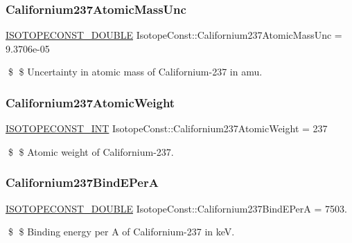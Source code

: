\subsubsection{\texorpdfstring{Californium237\+Atomic\+Mass\+Unc}{Californium237AtomicMassUnc}}
{\footnotesize\ttfamily \mbox{\hyperlink{group___isotope_const-_macros_ga8f45a7272ce02c0b4c65c44636ed719a}{I\+S\+O\+T\+O\+P\+E\+C\+O\+N\+S\+T\+\_\+\+D\+O\+U\+B\+LE}} Isotope\+Const\+::\+Californium237\+Atomic\+Mass\+Unc = 9.\+3706e-\/05}

\$ \$ Uncertainty in atomic mass of Californium-\/237 in amu. \mbox{\label{group___isotope_const-_californium-_cf237_gadfb41fc8fc7691fd99783629ab7826ae}} 
\subsubsection{\texorpdfstring{Californium237\+Atomic\+Weight}{Californium237AtomicWeight}}
{\footnotesize\ttfamily \mbox{\hyperlink{group___isotope_const-_macros_ga5f18360b3e99483a35c32d789e62621c}{I\+S\+O\+T\+O\+P\+E\+C\+O\+N\+S\+T\+\_\+\+I\+NT}} Isotope\+Const\+::\+Californium237\+Atomic\+Weight = 237}

\$ \$ Atomic weight of Californium-\/237. \mbox{\label{group___isotope_const-_californium-_cf237_ga32c21d4fefa0ae2bebfe7cb2ca42b826}} 
\subsubsection{\texorpdfstring{Californium237\+Bind\+E\+PerA}{Californium237BindEPerA}}
{\footnotesize\ttfamily \mbox{\hyperlink{group___isotope_const-_macros_ga8f45a7272ce02c0b4c65c44636ed719a}{I\+S\+O\+T\+O\+P\+E\+C\+O\+N\+S\+T\+\_\+\+D\+O\+U\+B\+LE}} Isotope\+Const\+::\+Californium237\+Bind\+E\+PerA = 7503.}

\$ \$ Binding energy per A of Californium-\/237 in keV. \mbox{\label{group___isotope_const-_californium-_cf237_gac10aefacce5cc2e8f758ffb51935ac47}} 
